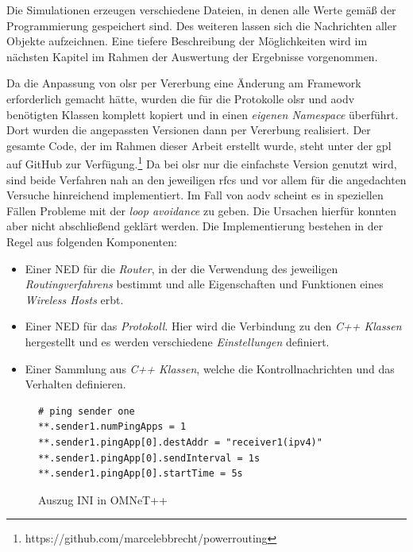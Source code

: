 Die Simulationen erzeugen verschiedene Dateien, in denen alle Werte gemäß der Programmierung gespeichert sind. Des weiteren lassen sich die Nachrichten aller Objekte aufzeichnen. Eine tiefere Beschreibung der Möglichkeiten wird im nächsten Kapitel im Rahmen der Auswertung der Ergebnisse vorgenommen.\newline

Da die Anpassung von \gls{olsr} per Vererbung eine Änderung am Framework erforderlich gemacht hätte, wurden die für die Protokolle \gls{olsr} und \gls{aodv} benötigten Klassen komplett kopiert und in einen \textit{eigenen Namespace} überführt. Dort wurden die angepassten Versionen dann per Vererbung realisiert. Der gesamte Code, der im Rahmen dieser Arbeit erstellt wurde, steht unter der \gls{gpl} auf GitHub zur Verfügung.\footnote{https://github.com/marcelebbrecht/powerrouting} Da bei \gls{olsr} nur die einfachste Version genutzt wird, sind beide Verfahren nah an den jeweiligen \glspl{rfc} und vor allem für die angedachten Versuche hinreichend implementiert. Im Fall von \gls{aodv} scheint es in speziellen Fällen Probleme mit der \textit{loop avoidance} zu geben. Die Ursachen hierfür konnten aber nicht abschließend geklärt werden. Die Implementierung bestehen in der Regel aus folgenden Komponenten:

\begin{itemize}
\item Einer NED für die \textit{Router}, in der die Verwendung des jeweiligen \textit{Routingverfahrens} bestimmt und alle Eigenschaften und Funktionen eines \textit{Wireless Hosts} erbt.
\item Einer NED für das \textit{Protokoll}. Hier wird die Verbindung zu den \textit{C++ Klassen} hergestellt und es werden verschiedene \textit{Einstellungen} definiert.
\item Einer Sammlung aus \textit{C++ Klassen}, welche die Kontrollnachrichten und das Verhalten definieren.
\end{itemize}

\begin{figure}
  \centering
  \footnotesize
  \begin{lstlisting}[frame=single]
# ping sender one
**.sender1.numPingApps = 1
**.sender1.pingApp[0].destAddr = "receiver1(ipv4)"
**.sender1.pingApp[0].sendInterval = 1s
**.sender1.pingApp[0].startTime = 5s

  \end{lstlisting}
  \caption{Auszug INI in OMNeT++}
  \label{listing:omnet:ini}
\end{figure}

